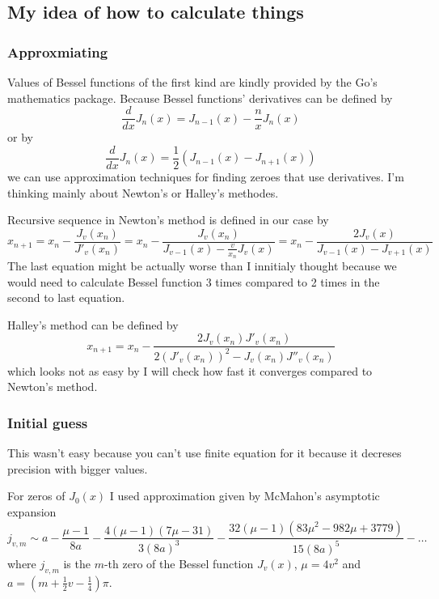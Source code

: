 \documentclass[a4paper]{article}
\begin{document}
	\subsection{My idea of how to calculate things}
	\subsubsection{Approxmiating}
	Values of Bessel functions of the first kind are
	kindly provided by the Go's mathematics package.
	Because Bessel functions' derivatives can be defined by 
	\begin{equation*}
		\frac{d}{dx}J_n(x) = J_{n-1}(x) - \frac{n}{x}J_n(x)
	\end{equation*}
	or by
	\begin{equation*}
		\frac{d}{dx}J_n(x) = \frac{1}{2}(J_{n-1}(x) - J_{n+1}(x))
	\end{equation*}
	we can use approximation techniques for finding zeroes that use derivatives.
	I'm thinking mainly about Newton's or Halley's methodes.

	Recursive sequence in Newton's method is defined in our case by
	\begin{equation*}
		x_{n+1} = x_n - \frac{J_v(x_n)}{J'_v(x_n)} = 
			x_n - \frac{J_v(x_n)}{J_{v-1}(x) - \frac{v}{x_n}J_v(x)} =
			x_n - \frac{2J_v(x)}{J_{v-1}(x) - J_{v+1}(x)}
	\end{equation*}
	The last equation might be actually worse than I innitialy thought
	because we would need to calculate Bessel function 3 times compared to 2 times
	in the second to last equation.

	Halley's method can be defined by
	\begin{equation*}
		x_{n+1} = x_n - \frac{2J_v(x_n)J'_v(x_n)}{2(J'_v(x_n))^2 - J_v(x_n)J''_v(x_n)}
	\end{equation*}
	which looks not as easy by I will check how fast it converges compared to
	Newton's method.
	\subsubsection{Initial guess}
	This wasn't easy because you can't use finite equation for 
	it because it decreses precision with bigger values.

	For zeros of $J_0(x)$ I used approximation given by McMahon's
	asymptotic expansion \cite[equation 10.21.19]{NIST:DLMF}	
	\begin{equation}
		j_{v,m} \sim a - \frac{\mu - 1}{8a} - \frac{4(\mu -1)(7\mu-31)}{3(8a)^3}
			- \frac{32(\mu-1)(83\mu^2-982\mu+3779)}{15(8a)^5} - \dots
	\end{equation}
	where $j_{v,m}$ is the $m$-th zero of the Bessel function $J_v(x)$,
	$\mu=4v^2$ and $a=(m+\frac{1}{2}v-\frac{1}{4})\pi$.
	
\end{document}
